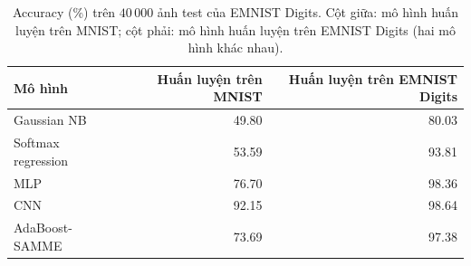 \begin{table}[tbp]\centering\small
\begin{tabular}{lrr}
\toprule
Mô hình & Huấn luyện trên MNIST & Huấn luyện trên EMNIST Digits \\
\midrule
Gaussian NB & 49.80 & 80.03 \\
Softmax regression & 53.59 & 93.81 \\
MLP & 76.70 & 98.36 \\
CNN & 92.15 & 98.64 \\
AdaBoost-SAMME & 73.69 & 97.38 \\
\bottomrule
\end{tabular}
\caption{Accuracy (\%) trên $40\,000$ ảnh test của EMNIST Digits. Cột giữa: mô hình huấn luyện trên MNIST; cột phải: mô hình huấn luyện trên EMNIST Digits (hai mô hình khác nhau).}
\label{tab:cross-eval}
\end{table}
